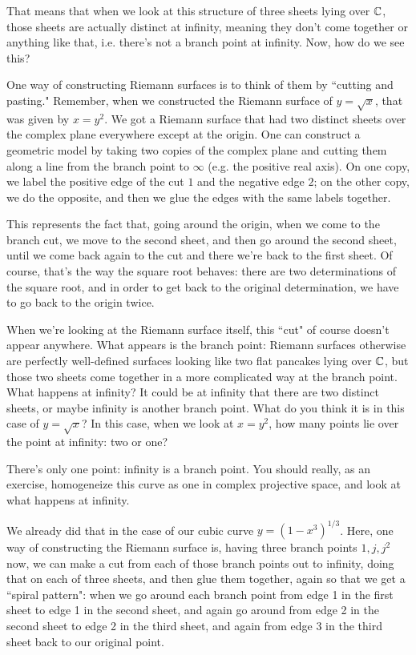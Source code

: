 \documentclass{article}
\begin{document}
\begin{enumerate}
  That means that when we look at this structure of three sheets lying over \(\mathbb{C}\), those sheets are actually distinct at infinity, meaning they don't come together or anything like that, i.e. there's not a branch point at infinity. Now, how do we see this?

  One way of constructing Riemann surfaces is to think of them by ``cutting and pasting." Remember, when we constructed the Riemann surface of \(y = \sqrt{x}\), that was given by \(x = y^2\). We got a Riemann surface that had two distinct sheets over the complex plane everywhere except at the origin. One can construct a geometric model by taking two copies of the complex plane and cutting them along a line from the branch point to \(\infty\) (e.g. the positive real axis). On one copy, we label the positive edge of the cut \(1\) and the negative edge \(2\); on the other copy, we do the opposite, and then we glue the edges with the same labels together.

  This represents the fact that, going around the origin, when we come to the branch cut, we move to the second sheet, and then go around the second sheet, until we come back again to the cut and there we're back to the first sheet. Of course, that's the way the square root behaves: there are two determinations of the square root, and in order to get back to the original determination, we have to go back to the origin twice.

  When we're looking at the Riemann surface itself, this ``cut" of course doesn't appear anywhere. What appears is the branch point: Riemann surfaces otherwise are perfectly well-defined surfaces looking like two flat pancakes lying over \(\mathbb{C}\), but those two sheets come together in a more complicated way at the branch point. What happens at infinity? It could be at infinity that there are two distinct sheets, or maybe infinity is another branch point. What do you think it is in this case of \(y = \sqrt{x}\)? In this case, when we look at \(x = y^2\), how many points lie over the point at infinity: two or one?

  There's only one point: infinity is a branch point. You should really, as an exercise, homogeneize this curve as one in complex projective space, and look at what happens at infinity.

  We already did that in the case of our cubic curve \(y = (1 - x^3)^{1/3}\). Here, one way of constructing the Riemann surface is, having three branch points \(1, j, j^2\) now, we can make a cut from each of those branch points out to infinity, doing that on each of three sheets, and then glue them together, again so that we get a ``spiral pattern": when we go around each branch point from edge 1 in the first sheet to edge 1 in the second sheet, and again go around from edge 2 in the second sheet to edge 2 in the third sheet, and again from edge 3 in the third sheet back to our original point.


\end{enumerate}
\end{document}
